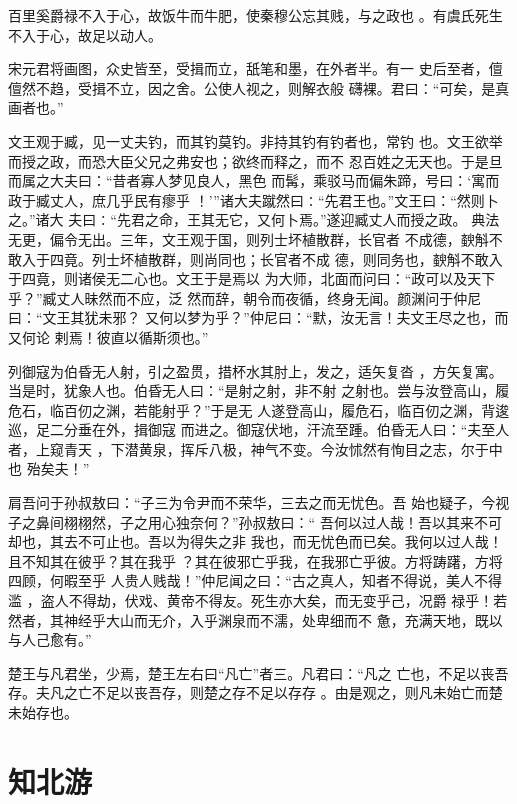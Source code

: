 \documentclass[a4paper,12pt,UTF8,twoside]{ctexbook}
\begin{document}
百里奚爵禄不入于心，故饭牛而牛肥，使秦穆公忘其贱，与之政也 。有虞氏死生不入于心，故足以动人。

宋元君将画图，众史皆至，受揖而立，舐笔和墨，在外者半。有一 史后至者，儃儃然不趋，受揖不立，因之舍。公使人视之，则解衣般 礴裸。君曰：“可矣，是真画者也。”

文王观于臧，见一丈夫钓，而其钓莫钓。非持其钓有钓者也，常钓 也。文王欲举而授之政，而恐大臣父兄之弗安也；欲终而释之，而不 忍百姓之无天也。于是旦而属之大夫曰：“昔者寡人梦见良人，黑色 而髯，乘驳马而偏朱蹄，号曰：‘寓而政于臧丈人，庶几乎民有瘳乎 ！’”诸大夫蹴然曰∶“先君王也。”文王曰：“然则卜之。”诸大 夫曰∶“先君之命，王其无它，又何卜焉。”遂迎臧丈人而授之政。 典法无更，偏令无出。三年，文王观于国，则列士坏植散群，长官者 不成德，斔斛不敢入于四竟。列士坏植散群，则尚同也；长官者不成 德，则同务也，斔斛不敢入于四竟，则诸侯无二心也。文王于是焉以 为大师，北面而问曰：“政可以及天下乎？”臧丈人昧然而不应，泛 然而辞，朝令而夜循，终身无闻。颜渊问于仲尼曰：“文王其犹未邪？ 又何以梦为乎？”仲尼曰：“默，汝无言！夫文王尽之也，而又何论 剌焉！彼直以循斯须也。”

列御寇为伯昏无人射，引之盈贯，措杯水其肘上，发之，适矢复沓 ，方矢复寓。当是时，犹象人也。伯昏无人曰：“是射之射，非不射 之射也。尝与汝登高山，履危石，临百仞之渊，若能射乎？”于是无 人遂登高山，履危石，临百仞之渊，背逡巡，足二分垂在外，揖御寇 而进之。御寇伏地，汗流至踵。伯昏无人曰：“夫至人者，上窥青天 ，下潜黄泉，挥斥八极，神气不变。今汝怵然有恂目之志，尔于中也 殆矣夫！”

肩吾问于孙叔敖曰：“子三为令尹而不荣华，三去之而无忧色。吾 始也疑子，今视子之鼻间栩栩然，子之用心独奈何？”孙叔敖曰：“ 吾何以过人哉！吾以其来不可却也，其去不可止也。吾以为得失之非 我也，而无忧色而已矣。我何以过人哉！且不知其在彼乎？其在我乎 ？其在彼邪亡乎我，在我邪亡乎彼。方将踌躇，方将四顾，何暇至乎 人贵人贱哉！”仲尼闻之曰：“古之真人，知者不得说，美人不得滥 ，盗人不得劫，伏戏、黄帝不得友。死生亦大矣，而无变乎己，况爵 禄乎！若然者，其神经乎大山而无介，入乎渊泉而不濡，处卑细而不 惫，充满天地，既以与人己愈有。”

楚王与凡君坐，少焉，楚王左右曰“凡亡”者三。凡君曰：“凡之 亡也，不足以丧吾存。夫凡之亡不足以丧吾存，则楚之存不足以存存 。由是观之，则凡未始亡而楚未始存也。


\section{知北游}
\end{document}

